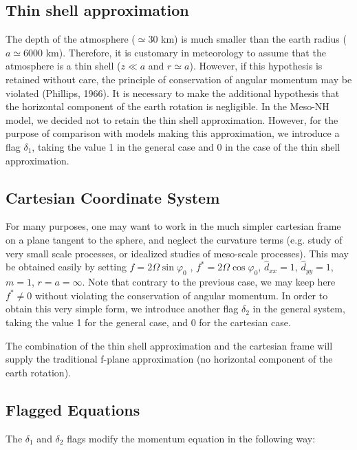 \subsection{Thin shell approximation}

The depth of the atmosphere ($\simeq 30$ km) is much smaller than the earth
radius ($a \simeq 6000 $ km). Therefore, it is customary in meteorology
to assume that the atmosphere is a thin shell ($z \ll a$ and $r \simeq a$).
However, if this hypothesis is retained without care, the principle of
conservation of angular momentum may be violated (Phillips, 1966).
It is necessary to make the additional hypothesis that the horizontal
component of the earth rotation is negligible. In the Meso-NH model, we
decided not to retain the thin shell approximation. However, for the
purpose of comparison with models making this approximation,
we introduce a flag $\delta_1$, taking the value 1 in the general case
and 0 in the case of the thin shell approximation.

\subsection{Cartesian Coordinate System}

For many purposes, one may want to work in the much simpler
cartesian frame on a plane tangent to the sphere,
and neglect the curvature terms (e.g. study of very small
scale processes, or idealized studies of meso-scale processes). This may be
obtained easily by setting $f=2 \Omega \sin \varphi _{0}$ ,
$f^{*}=2 \Omega \cos \varphi _{0}$, $\widehat{d}_{xx}=1$, $\widehat{d}_{yy}=1$,
$m=1$, $r=a=\infty$.
Note that contrary to the previous case, we may keep here $f^{*} \neq 0$
without violating the conservation of angular momentum.
In order to obtain this very simple form, we introduce another flag
$\delta_2$ in the general system, taking the value 1 for the general case,
and 0 for the cartesian case.

The combination of the thin shell approximation and the cartesian frame
will supply the traditional f-plane approximation (no horizontal component
of the earth rotation).

\subsection{Flagged Equations}

The $\delta_1$ and $\delta_2$ flags modify the momentum equation in the
following way:

